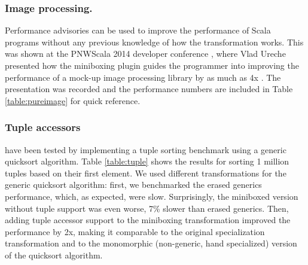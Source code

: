 \subsubsection{Image processing.} Performance advisories can be used to improve the performance of Scala programs without any previous knowledge of how the transformation works. This was shown at the PNWScala 2014 developer conference \cite{pnwscala-conf}, where Vlad Ureche presented how the miniboxing plugin guides the programmer into improving the performance of a mock-up image processing library by as much as 4x \cite{pnwscala-pureimage}. The presentation was recorded and the performance numbers are included in Table \ref{table:pureimage} for quick reference.

\vspace{-0.45em}

\subsubsection{Tuple accessors} have been tested by implementing a tuple sorting benchmark using a generic quicksort algorithm. Table \ref{table:tuple} shows the results for sorting 1 million tuples based on their first element. We used different transformations for the generic quicksort algorithm: first, we benchmarked the erased generics performance, which, as expected, were slow. Surprisingly, the miniboxed version without tuple support was even worse, 7\% slower than erased generics. Then, adding tuple accessor support to the miniboxing transformation improved the performance by 2x, making it comparable to the original specialization transformation and to the monomorphic (non-generic, hand specialized) version of the quicksort algorithm.
